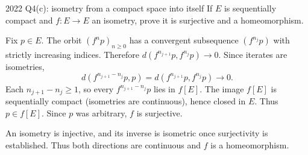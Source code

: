 \begin{exam}{2022 Q4(c): isometry from a compact space into itself}
If $E$ is sequentially compact and $f:E\to E$ an isometry, prove it is surjective and a homeomorphism.
\end{exam}
\begin{answer}
Fix $p\in E$. The orbit $(f^np)_{n\ge0}$ has a convergent subsequence $(f^{n_j}p)$ with strictly increasing indices. Therefore $d(f^{n_{j+1}}p,f^{n_j}p)\to0$. Since iterates are isometries,
\[d(f^{n_{j+1}-n_j}p,p)=d(f^{n_{j+1}}p,f^{n_j}p)\to0.\]
Each $n_{j+1}-n_j\ge1$, so every $f^{n_{j+1}-n_j}p$ lies in $f[E]$. The image $f[E]$ is sequentially compact (isometries are continuous), hence closed in $E$. Thus $p\in f[E]$. Since $p$ was arbitrary, $f$ is surjective.

An isometry is injective, and its inverse is isometric once surjectivity is established. Thus both directions are continuous and $f$ is a homeomorphism.
\end{answer}


